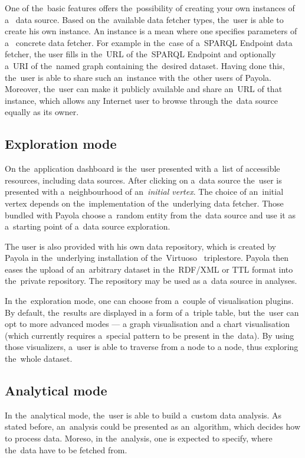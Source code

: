 One of the~basic features offers the~possibility of creating your own instances of a~
data source. Based on the~available data fetcher types, the~user is able to create 
his own instance. An instance is a mean where one specifies parameters of a~
concrete data fetcher. For example in the~case of a~SPARQL Endpoint data fetcher,
the user fills in the~URL of the~SPARQL Endpoint and optionally a~URI of the~named graph 
containing the~desired dataset. Having done this, the~user is able to share 
such an~instance with the~other users of Payola.
Moreover, the~user can make it 
publicly available and share an~URL of that instance, which allows any 
Internet user to browse through the~data source equally as its owner.

\subsection{Exploration mode}
On the~application dashboard is the~user presented with a~list of accessible 
resources, including data sources. After clicking on a~data source the~user is
presented with a~neighbourhood of an~\emph{initial vertex}. The choice of an~initial vertex
depends on the~implementation of the~underlying data fetcher.
Those bundled with Payola choose a~random entity from the~data source
and use it as a~starting point of a~data source exploration.

The user is also provided with his own data repository, which is created by 
Payola in the~underlying installation of the~Virtuoso~\cite{virtuoso} triplestore. Payola then eases 
the upload of an~arbitrary dataset in the~RDF/XML or TTL 
format into the~private repository. The repository may be used as a~data source in analyses.

In the~exploration mode, one can choose from a~couple of visualisation plugins. 
By default, the~results are displayed in a form of a~triple table, but the~user can 
opt to more advanced modes --- a graph visualisation and a chart visualisation
(which currently requires a~special pattern to be present in the~data). By using those 
visualizers, a~user is able to traverse from a node to a node, thus exploring the~whole 
dataset.

\subsection{Analytical mode}
In the~analytical mode, the~user is able to build a~custom data analysis. As 
stated before, an~analysis could be presented as an~algorithm, which decides 
how to process data. Moreso, in the~analysis, one is expected to specify, 
where the~data have to be fetched from.


